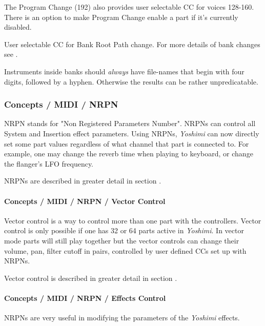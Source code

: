    The Program Change (192) also provides user selectable CC for voices
   128-160.  There is an option to make Program Change enable a part if it's
   currently disabled.

   User selectable CC for Bank Root Path change.
   For more details of bank changes see
   .

   Instruments inside banks should \textsl{always} have file-names that
   begin with four digits,  followed
   by a hyphen. Otherwise the results can be rather unpredicatable.

\subsubsection{Concepts / MIDI / NRPN}
\label{subsubsec:concepts_midi_nrpn}

   NRPN stands for "Non Registered Parameters Number".
   NRPNs can control all System and Insertion effect parameters.
   Using NRPNs, \textsl{Yoshimi} can now directly set some part values
   regardless of what channel that part is connected to.  For example, one
   may change the reverb time when playing to keyboard, or
   change the flanger's LFO frequency.

   NRPNs are described in greater detail in section
   .

\paragraph{Concepts / MIDI / NRPN / Vector Control}
\label{paragraph:concepts_midi_nrpn_vector_control}

   Vector control is a way to control more than one part with the
   controllers.
   Vector control is only possible if one has 32 or 64 parts active 
   in \textsl{Yoshimi}.
   In vector mode parts will still play together but the vector controls can
   change their volume, pan, filter cutoff in pairs, controlled by user
   defined CCs set up with NRPNs.

   Vector control is described in greater detail in section
   .

\paragraph{Concepts / MIDI / NRPN / Effects Control}
\label{paragraph:concepts_midi_nrpn_effects_control}

   NRPNs are very useful in modifying the parameters of the
   \textsl{Yoshimi} effects.


